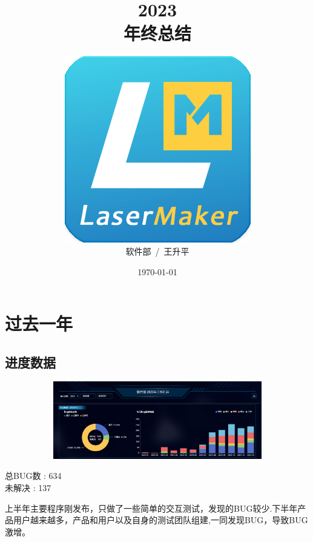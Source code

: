 \documentclass[AutoFakeBold,AutoFakeSlant]{beamer}
\title{\textbf{2023}\\年终总结}
\date{\today}
\author{\includegraphics[width=0.26\linewidth]{LaserMaker}\\软件部~/~王升平}
\begin{document}
	
	\maketitle
	
	\section{过去一年}
	\subsection{进度数据}
	
	\begin{frame}[fragile]
		\begin{figure}
			\centering %
			\begin{subfigure}{\linewidth}
				\includegraphics[width=\linewidth]{bug}
			\end{subfigure}
		\end{figure} 
		
		\begin{minipage}[l]{0.3\linewidth}
			\large
			总BUG数 : 634 \\
			未解决  : 137
		\end{minipage}\hfill
		\begin{minipage}[l]{0.6\linewidth}
			\footnotesize
			\linespread{1.5} \selectfont
			上半年主要程序刚发布，只做了一些简单的交互测试，发现的BUG较少.下半年产品用户越来越多，产品和用户以及自身的测试团队组建,一同发现BUG，导致BUG激增。
		\end{minipage}
	\end{frame}
	
\end{document}

